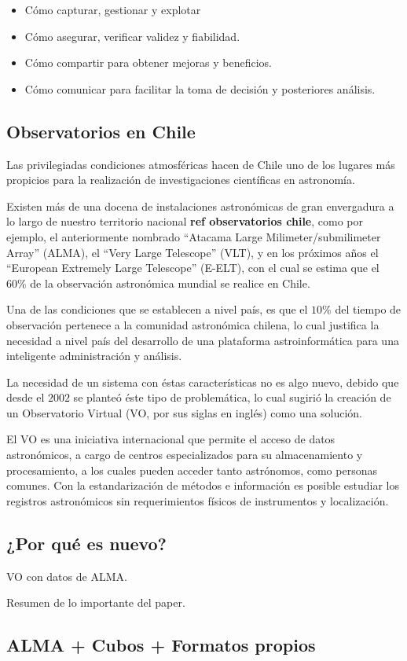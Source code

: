 \begin{itemize}
    \item Cómo capturar, gestionar y explotar
    \item Cómo asegurar, verificar validez y fiabilidad.
    \item Cómo compartir para obtener mejoras y beneficios.
    \item Cómo comunicar para facilitar la toma de decisión y posteriores análisis.
\end{itemize}

\subsection{Observatorios en Chile}

Las privilegiadas condiciones atmosféricas hacen de Chile uno de los lugares más
propicios para la realización de investigaciones científicas en astronomía.

Existen más de una docena de instalaciones astronómicas de gran envergadura a lo
largo de nuestro territorio nacional {\bf ref observatorios chile}, como por ejemplo,
el anteriormente nombrado ``Atacama Large Milimeter/submilimeter Array'' (ALMA),
el ``Very Large Telescope'' (VLT), y en los próximos años el ``European Extremely
Large Telescope'' (E-ELT), con el cual se estima que el $60\%$ de la observación
astronómica mundial se realice en Chile.

Una de las condiciones que se establecen a nivel país, es que el $10\%$ del tiempo
de observación pertenece a la comunidad astronómica chilena, lo cual justifica
la necesidad a nivel país del desarrollo de una plataforma astroinformática
para una inteligente administración y análisis.

La necesidad de un sistema con éstas características no es algo nuevo,
debido que desde el $2002$ se planteó éste tipo de problemática, lo cual sugirió
la creación de un Observatorio Virtual (VO, por sus siglas en inglés) como una solución.

El VO es una iniciativa internacional que permite el acceso de datos astronómicos,
a cargo de centros especializados para su almacenamiento y procesamiento,
a los cuales pueden acceder tanto astrónomos, como personas comunes.
Con la estandarización de métodos e información es posible estudiar los registros
astronómicos sin requerimientos físicos de instrumentos y localización.

\subsection{¿Por qué es nuevo?}
VO con datos de ALMA.

Resumen de lo importante del paper.



\subsection{ALMA + Cubos + Formatos propios}
